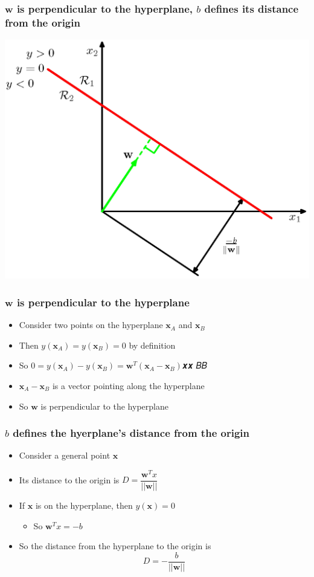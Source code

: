 \documentclass[12pt,notes,mathserif]{beamer}
\begin{document}
\begin{frame}[c]
\frametitle{$\mathbf{w}$ is perpendicular to the hyperplane, $b$ defines its distance from the origin}
\begin{center}
\includegraphics[width=0.7\linewidth]{fig8/lec812.jpg}
\end{center}
\end{frame}


\begin{frame}[c]
\frametitle{$\mathbf{w}$ is perpendicular to the hyperplane}
\begin{itemize}
\item Consider two points on the hyperplane $\mathbf{x}_A$ and $\mathbf{x}_B$
\item Then $y(\mathbf{x}_A)=y(\mathbf{x}_B)=0$ by definition
\item So $0 =y(\mathbf{x}_A)− y(\mathbf{x}_B) = \mathbf{w}^T(\mathbf{x}_A-\mathbf{x}_B)$𝒙𝒙 𝐵𝐵 
\item $\mathbf{x}_A-\mathbf{x}_B$ is  a vector pointing along the hyperplane
\item So $\mathbf{w}$ is perpendicular to the hyperplane
\end{itemize}

\end{frame}





\begin{frame}[c]
\frametitle{$b$ defines the hyerplane's distance from the origin}
\begin{itemize}
\item Consider a general point $\mathbf{x}$
\item Its distance to the origin is $D=\dfrac{\mathbf{w}^Tx}{||\mathbf{w}||}$
\item If $\mathbf{x}$ is on the hyperplane, then $y(\mathbf{x})=0$
		\begin{itemize}
		\item So $\mathbf{w}^T x=-b$
		\end{itemize}
\item So the distance from the hyperplane to the origin is
\[
D=-\dfrac{b}{||\mathbf{w}||}
\]
\end{itemize}

\end{frame}
\end{document}
